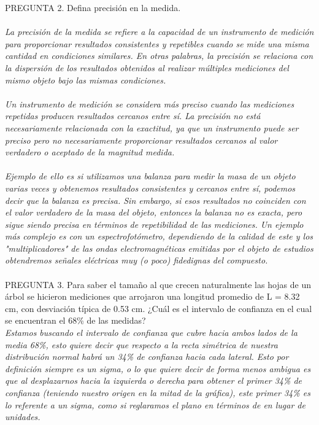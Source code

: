 \documentclass{article}
\begin{document}
PREGUNTA 2. Defina precisión en la medida. \\\\
\textit{La precisión de la medida se refiere a la capacidad de un instrumento de medición para proporcionar resultados consistentes y repetibles cuando se mide una misma cantidad en condiciones similares. En otras palabras, la precisión se relaciona con la dispersión de los resultados obtenidos al realizar múltiples mediciones del mismo objeto bajo las mismas condiciones.} \\\\

\textit{Un instrumento de medición se considera más preciso cuando las mediciones repetidas producen resultados cercanos entre sí. La precisión no está necesariamente relacionada con la exactitud, ya que un instrumento puede ser preciso pero no necesariamente proporcionar resultados cercanos al valor verdadero o aceptado de la magnitud medida.}\\\\

\textit{Ejemplo de ello es si utilizamos una balanza para medir la masa de un objeto varias veces y obtenemos resultados consistentes y cercanos entre sí, podemos decir que la balanza es precisa. Sin embargo, si esos resultados no coinciden con el valor verdadero de la masa del objeto, entonces la balanza no es exacta, pero sigue siendo precisa en términos de repetibilidad de las mediciones. Un ejemplo más complejo es con un espectrofotómetro, dependiendo de la calidad de este y los "multiplicadores" de las ondas electromagnéticas emitidas por el objeto de estudios obtendremos señales eléctricas muy (o poco) fidedignas del compuesto.}\\\\

PREGUNTA 3. Para saber el tamaño al que crecen naturalmente las hojas de un
árbol se hicieron mediciones que arrojaron una longitud promedio de L = 8.32 cm,
con desviación típica de 0.53 cm. ¿Cuál es el intervalo de confianza en el cual se
encuentran el 68\% de las medidas?\\
\textit{Estamos buscando el intervalo de confianza que cubre  hacia ambos lados de la media 68\%, esto quiere decir que respecto a la recta simétrica de nuestra distribución normal habrá un 34\% de confianza hacia cada lateral. Esto por definición siempre es un sigma, o lo que quiere decir de forma menos ambigua es que al desplazarnos hacia la izquierda o derecha para obtener el primer 34\% de confianza (teniendo nuestro origen en la mitad de la gráfica), este primer 34\% es lo referente a un sigma, como si reglaramos el plano en términos de \sigma en lugar de unidades.}
\newpage
\end{document}

